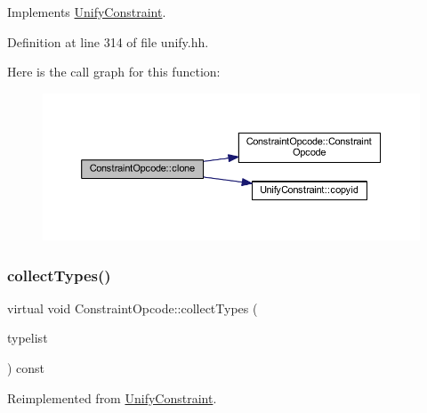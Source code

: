 Implements \mbox{\hyperlink{class_unify_constraint_a4f068343932637d355644bb21559aa12}{Unify\+Constraint}}.



Definition at line 314 of file unify.\+hh.

Here is the call graph for this function\+:
\nopagebreak
\begin{figure}[H]
\begin{center}
\leavevmode
\includegraphics[width=350pt]{class_constraint_opcode_aaa3bc0e6cc446941be344459b962e2b6_cgraph}
\end{center}
\end{figure}
\mbox{\label{class_constraint_opcode_a99d5a920f6260d33be99fd2b2ea40bc1}} 
\subsubsection{\texorpdfstring{collectTypes()}{collectTypes()}}
{\footnotesize\ttfamily virtual void Constraint\+Opcode\+::collect\+Types (\begin{DoxyParamCaption}\item[{vector$<$ \mbox{\hyperlink{class_unify_datatype}{Unify\+Datatype}} $>$ \&}]{typelist }\end{DoxyParamCaption}) const\hspace{0.3cm}{\ttfamily [virtual]}}



Reimplemented from \mbox{\hyperlink{class_unify_constraint_acb83b6bea3b21e13054e72ac9cfaba0f}{Unify\+Constraint}}.

\mbox{\label{class_constraint_opcode_a8216f50f387c229d3c7bbf50ce717aed}} 
